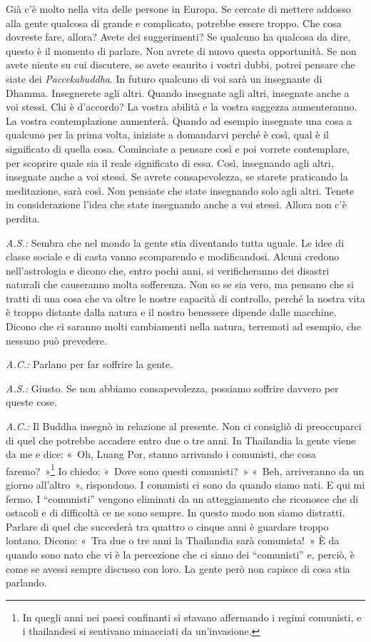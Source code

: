 Già c'è molto nella vita delle persone in Europa. Se cercate di mettere
addosso alla gente qualcosa di grande e complicato, potrebbe essere
troppo. Che cosa dovreste fare, allora? Avete dei suggerimenti? Se
qualcuno ha qualcosa da dire, questo è il momento di parlare. Non avrete
di nuovo questa opportunità. Se non avete niente su cui discutere, se
avete esaurito i vostri dubbi, potrei pensare che siate dei
\emph{Paccekabuddha}. In futuro qualcuno di voi sarà un insegnante di
Dhamma. Insegnerete agli altri. Quando insegnate agli altri, insegnate
anche a voi stessi. Chi è d'accordo? La vostra abilità e la vostra
saggezza aumenteranno. La vostra contemplazione aumenterà. Quando ad
esempio insegnate una cosa a qualcuno per la prima volta, iniziate a
domandarvi perché è così, qual è il significato di quella cosa.
Cominciate a pensare così e poi vorrete contemplare, per scoprire quale
sia il reale significato di essa. Così, insegnando agli altri, insegnate
anche a voi stessi. Se avrete consapevolezza, se starete praticando la
meditazione, sarà così. Non pensiate che state insegnando solo agli
altri. Tenete in considerazione l'idea che state insegnando anche a voi
stessi. Allora non c'è perdita.

\emph{A.S.:} Sembra che nel mondo la gente stia diventando tutta uguale. Le
idee di classe sociale e di casta vanno scomparendo e modificandosi.
Alcuni credono nell'astrologia e dicono che, entro pochi anni, si
verificheranno dei disastri naturali che causeranno molta sofferenza.
Non so se sia vero, ma pensano che si tratti di una cosa che va oltre le
nostre capacità di controllo, perché la nostra vita è troppo distante
dalla natura e il nostro benessere dipende dalle macchine. Dicono che ci
saranno molti cambiamenti nella natura, terremoti ad esempio, che
nessuno può prevedere.

\emph{A.C.:} Parlano per far soffrire la gente.

\emph{A.S.:} Giusto. Se non abbiamo consapevolezza, possiamo soffrire davvero
per queste cose.

\emph{A.C.:} Il Buddha insegnò in relazione al presente. Non ci consigliò di
preoccuparci di quel che potrebbe accadere entro due o tre anni. In
Thailandia la gente viene da me e dice: «~Oh, Luang Por, stanno
arrivando i comunisti, che cosa faremo?~»\footnote{In quegli anni nei
  paesi confinanti si stavano affermando i regimi comunisti, e i
  thailandesi si sentivano minacciati da un'invasione.} Io chiedo:
«~Dove sono questi comunisti?~» «~Beh, arriveranno da un giorno
all'altro~», rispondono. I comunisti ci sono da quando siamo nati. E qui
mi fermo. I ``comunisti'' vengono eliminati da un atteggiamento che
riconosce che di ostacoli e di difficoltà ce ne sono sempre. In questo
modo non siamo distratti. Parlare di quel che succederà tra quattro o
cinque anni è guardare troppo lontano. Dicono: «~Tra due o tre anni la
Thailandia sarà comunista!~» È da quando sono nato che vi è la
percezione che ci siano dei ``comunisti'' e, perciò, è come se avessi
sempre discusso con loro. La gente però non capisce di cosa stia
parlando.

